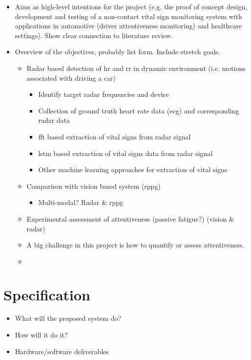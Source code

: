 \documentclass[11pt, parskip=half*,twoside=false]{scrbook}
\begin{document}
\begin{itemize}
	\item Aims as high-level intentions for the project (e.g. the proof of concept design, development and testing of a non-contact vital sign monitoring system with applications in automotive (driver attentiveness monitoring) and healthcare settings). Show clear connection to literature review. 
	\item Overview of the objectives, probably list form. Include stretch goals.
	\begin{itemize}
		\item Radar based detection of \gls{hr} and \gls{rr} in dynamic environment (i.e. motions associated with driving a car)
		\begin{itemize}
			\item Identify target radar frequencies and device
			\item Collection of ground truth heart rate data (\gls{ecg}) and corresponding radar data
			\item \gls{fft} based extraction of vital signs from radar signal
			\item \gls{lstm} based extraction of vital signs data from radar signal
			\item Other machine learning approaches for extraction of vital signs
		\end{itemize}
		\item Comparison with vision based system (\gls{rppg})
		\begin{itemize}
			\item Multi-modal? Radar \& \gls{rppg}
		\end{itemize}
		\item Experimental assessment of attentiveness (passive fatigue?) (vision \& radar)
		\item A big challenge in this project is how to quantify or assess attentiveness.
		\item 
	\end{itemize}
\end{itemize}

\section{Specification}
\begin{itemize}
	\item What will the proposed system do?
	\item How will it do it?
	\item Hardware/software deliverables
\end{itemize}
\end{document}
